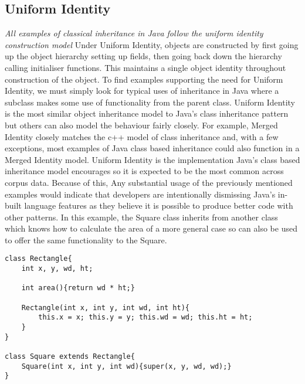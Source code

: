 \subsection{Uniform Identity}
\textit{All examples of classical inheritance in Java follow the uniform identity construction model}
\newline
\newline
Under Uniform Identity, objects are constructed by first going up the object hierarchy setting up fields, then going back down the hierarchy calling initialiser functions. This maintains a single object identity throughout construction of the object.\newline
To find examples supporting the need for Uniform Identity, we must simply look for typical uses of inheritance in Java where a subclass makes some use of functionality from the parent class. Uniform Identity is the most similar object inheritance model to Java’s class inheritance pattern but others can also model the behaviour fairly closely. For example, Merged Identity closely matches the c++ model of class inheritance and, with a few exceptions, most examples of Java class based inheritance could also function in a Merged Identity model. Uniform Identity is the implementation Java’s class based inheritance model encourages so it is expected to be the most common across corpus data. Because of this, Any substantial usage of the previously mentioned examples would indicate that developers are intentionally dismissing Java’s in-built language features as they believe it is possible to produce better code with other patterns.\newline
In this example, the Square class inherits from another class which knows how to calculate the area of a more general case so can also be used to offer the same functionality to the Square. 
\begin{lstlisting}
class Rectangle{
	int x, y, wd, ht;
	
	int area(){return wd * ht;}
	
	Rectangle(int x, int y, int wd, int ht){
		this.x = x; this.y = y; this.wd = wd; this.ht = ht;
	}
}

class Square extends Rectangle{
	Square(int x, int y, int wd){super(x, y, wd, wd);}
}
\end{lstlisting}

